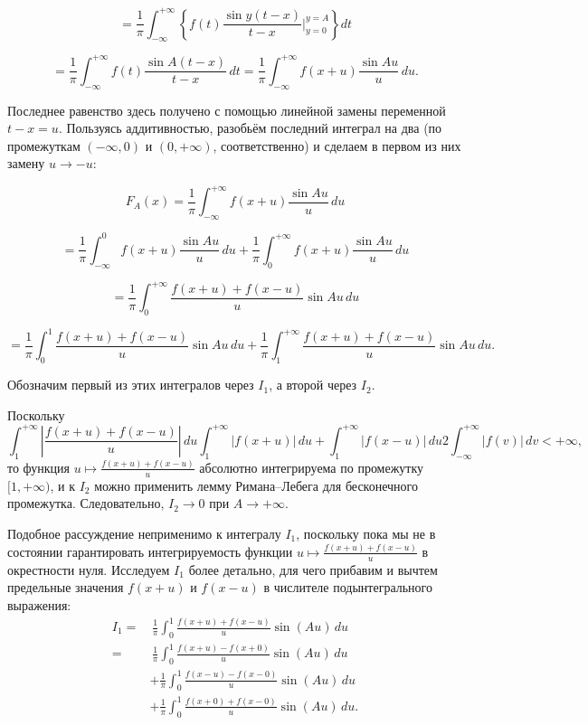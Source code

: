 {\[
= \frac{1}{\pi} \int_{-\infty}^{+\infty} \left\{ f(t) \frac{\sin y(t-x)}{t-x} \bigg|_{y=0}^{y=A} \right\} dt
\]

\[
= \frac{1}{\pi} \int_{-\infty}^{+\infty} f(t) \frac{\sin A(t-x)}{t-x} \, dt = \frac{1}{\pi} \int_{-\infty}^{+\infty} f(x+u) \frac{\sin Au}{u} \, du. \tag{1.37}
\]

Последнее равенство здесь получено с помощью линейной замены переменной \( t-x = u \). Пользуясь аддитивностью, разобьём последний интеграл на два (по промежуткам \((-∞, 0)\) и \((0, +∞)\), соответственно) и сделаем в первом из них замену \( u \to -u \):

\[
F_A(x) = \frac{1}{\pi} \int_{-\infty}^{+\infty} f(x+u) \frac{\sin Au}{u} \, du
\]

\[
= \frac{1}{\pi} \int_{-\infty}^{0} f(x+u) \frac{\sin Au}{u} \, du + \frac{1}{\pi} \int_{0}^{+\infty} f(x+u) \frac{\sin Au}{u} \, du
\]

\[
= \frac{1}{\pi} \int_{0}^{+\infty} \frac{f(x+u) + f(x-u)}{u} \sin Au \, du
\]

\[
= \frac{1}{\pi} \int_{0}^{1} \frac{f(x+u) + f(x-u)}{u} \sin Au \, du + \frac{1}{\pi} \int_{1}^{+\infty} \frac{f(x+u) + f(x-u)}{u} \sin Au \, du. \tag{1.38}
\]

Обозначим первый из этих интегралов через \( I_1 \), а второй через \( I_2 \).



Поскольку
\[
\int_{1}^{+\infty} \left| \frac{f(x + u) + f(x - u)}{u} \right| \, du \tag{1.39}

\int_{1}^{+\infty} |f(x + u)| \, du + \int_{1}^{+\infty} |f(x - u)| \, du \tag{1.40}

2 \int_{-\infty}^{+\infty} |f(v)| \, dv < +\infty, \tag{1.41}
\]
то функция \( u \mapsto \frac{f(x + u) + f(x - u)}{u} \) абсолютно интегрируема по промежутку \( [1, +\infty) \), и к \( I_2 \) можно применить лемму Римана–Лебега для бесконечного промежутка. Следовательно, \( I_2 \to 0 \) при \( A \to +\infty \).

Подобное рассуждение неприменимо к интегралу \( I_1 \), поскольку пока мы не в состоянии гарантировать интегрируемость функции \( u \mapsto \frac{f(x + u) + f(x - u)}{u} \) в окрестности нуля. Исследуем \( I_1 \) более детально, для чего прибавим и вычтем предельные значения \( f(x + u) \) и \( f(x - u) \) в числителе подынтегрального выражения:
\[
\begin{align*}
I_1 = & \, \frac{1}{\pi} \int_0^1 \frac{f(x + u) + f(x - u)}{u} \sin(Au) \, du \\
= & \, \frac{1}{\pi} \int_0^1 \frac{f(x + u) - f(x + 0)}{u} \sin(Au) \, du \\
& + \frac{1}{\pi} \int_0^1 \frac{f(x - u) - f(x - 0)}{u} \sin(Au) \, du \\
& + \frac{1}{\pi} \int_0^1 \frac{f(x + 0) + f(x - 0)}{u} \sin(Au) \, du. \tag{1.42}
\end{align*}
\]

}
